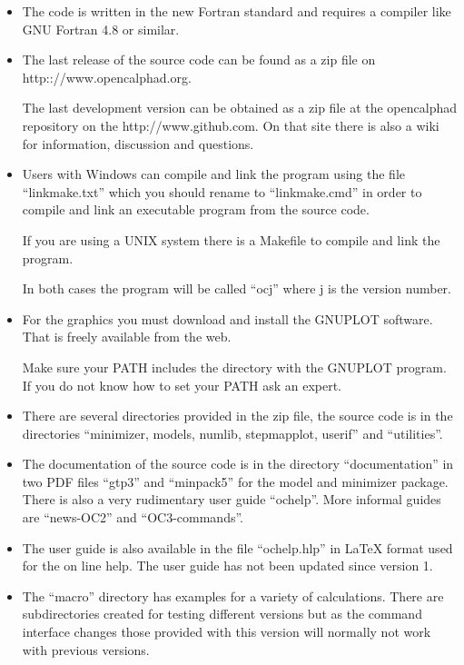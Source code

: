 \documentclass[12pt]{article}
\begin{document}
\begin{itemize}
\item The code is written in the new Fortran standard and requires a
  compiler like GNU Fortran 4.8 or similar.

\item The last release of the source code can be found as a zip file
  on http:://www.opencalphad.org.

  The last development version can be obtained as a zip file at the
  opencalphad repository on the http://www.github.com.  On that site
  there is also a wiki for information, discussion and questions.

\item Users with Windows can compile and link the program using the
  file ``linkmake.txt'' which you should rename to ``linkmake.cmd'' in
  order to compile and link an executable program from the source
  code.

  If you are using a UNIX system there is a Makefile to compile and link
  the program.

  In both cases the program will be called ``ocj'' where j is the
  version number.

\item For the graphics you must download and install the GNUPLOT
  software.  That is freely available from the web.

  Make sure your PATH includes the directory with the GNUPLOT program.
  If you do not know how to set your PATH ask an expert.

\item There are several directories provided in the zip file, the
  source code is in the directories ``minimizer, models, numlib,
  stepmapplot, userif'' and ``utilities''.

\item The documentation of the source code is in the directory
  ``documentation'' in two PDF files ``gtp3'' and ``minpack5'' for the
  model and minimizer package.  There is also a very rudimentary user
  guide ``ochelp''.  More informal guides are ``news-OC2'' and
  ``OC3-commands''.

\item The user guide is also available in the file ``ochelp.hlp'' in
  LaTeX format used for the on line help.  The user guide has not been
  updated since version 1.

\item The ``macro'' directory has examples for a variety of
  calculations.  There are subdirectories created for testing
  different versions but as the command interface changes those
  provided with this version will normally not work with previous
  versions.


\end{itemize}
\end{document}
